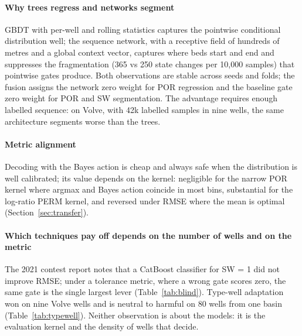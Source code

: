 \documentclass[preprint,12pt]{elsarticle}
\begin{document}
\paragraph{Why trees regress and networks segment} GBDT with per-well and rolling statistics captures the pointwise conditional distribution well; the sequence network, with a receptive field of hundreds of metres and a global context vector, captures where beds start and end and suppresses the fragmentation (365 vs 250 state changes per 10,000 samples) that pointwise gates produce. Both observations are stable across seeds and folds; the fusion assigns the network zero weight for POR regression and the baseline gate zero weight for POR and SW segmentation. The advantage requires enough labelled sequence: on Volve, with 42k labelled samples in nine wells, the same architecture segments worse than the trees.

\paragraph{Metric alignment} Decoding with the Bayes action is cheap and always safe when the distribution is well calibrated; its value depends on the kernel: negligible for the narrow POR kernel where argmax and Bayes action coincide in most bins, substantial for the log-ratio PERM kernel, and reversed under RMSE where the mean is optimal (Section~\ref{sec:transfer}).

\paragraph{Which techniques pay off depends on the number of wells and on the metric} The 2021 contest report notes that a CatBoost classifier for SW = 1 did not improve RMSE; under a tolerance metric, where a wrong gate scores zero, the same gate is the single largest lever (Table~\ref{tab:blind}). Type-well adaptation won on nine Volve wells and is neutral to harmful on 80 wells from one basin (Table~\ref{tab:typewell}). Neither observation is about the models: it is the evaluation kernel and the density of wells that decide.
\end{document}
